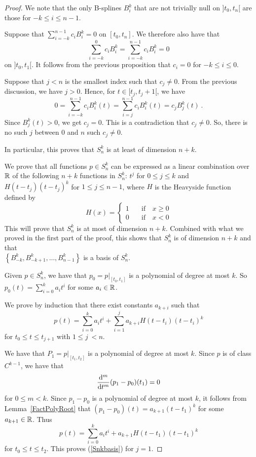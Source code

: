\begin{proof}
We note that the only B-splines $B_i^k$ that are not trivially null on
$]t_0,t_n[$ are those for $-k \leq i \leq n-1$.

Suppose that $\displaystyle \sum_{i=-k}^{n-1} c_i B_i^k = 0$ on $[t_0,t_n]$.
We therefore also have that
\[
  \sum_{i=-k}^0 c_i B_i^k = \sum_{i=-k}^{n-1} c_i B_i^k = 0
\]
on $]t_0,t_1[$.  It follows from the previous proposition that
$c_i = 0$ for $-k \leq i \leq 0$.

Suppose that $j<n$ is the smallest index such that $c_j\neq 0$.  From
the previous discussion, we have $j>0$.  Hence, for
$t \in [t_j,t_j+1[$, we have
\[
 0 = \sum_{i=-k}^{n-1} c_i B_i^k(t) = \sum_{i=j}^{n-1} c_i B_i^k(t) =
  c_j B_j^k(t) \ .
\]
Since $B_j^k(t) > 0$, we get $c_j = 0$.  This is a contradiction that
$c_j \neq 0$.  So, there is no such $j$ between $0$ and $n$ such
$c_j \neq 0$.

In particular, this proves that $S_n^k$ is at least of dimension
$n+k$. 

We prove that all functions $p \in S_n^k$ can be expressed as a linear
combination over $\RR$ of the following $n+k$ functions in $S_n^k$:
$t^j$ for $0\leq j \leq k$ and $H(t-t_j)(t-t_j)^k$ for
$1\leq j \leq n-1$, where $H$ is the Heavyside function defined by
\[
  H(x) = \begin{cases} 1 & \quad \text{if} \quad x \geq 0 \\
    0 & \quad \text{if} \quad x < 0
  \end{cases}
\]
This will prove that $S_n^k$ is at most of dimension $n+k$.  Combined
with what we proved in the first part of the proof, this shows that
$S_n^k$ is of dimension $n+k$ and that\\
$\displaystyle \left\{ B_{-k}^k, B_{-k+1}^k, \ldots , B_{n-1}^k \right\}$
is a basis of $S_n^k$.

Given $p \in S_n^k$, we have that $p_0 = p\big|_{[t_0,t_1]}$ is a polynomial
of degree at most $k$.  So
$\displaystyle p_0(t) = \sum_{i=0}^k a_i t^i$ for some $a_i \in \RR$.

We prove by induction that there exist constants $a_{k+i}$ such that
\begin{equation}\label{Snkbasis}
  p(t) =  \sum_{i=0}^k a_i t^i + \sum_{i=1}^j a_{k+i}H(t-t_i)(t-t_i)^k
\end{equation}
for $t_0 \leq t \leq t_{j+1}$ with $1 \leq j\ < n$.

We have that $P_1 = p\big|_{[t_1,t_2]}$ is a polynomial of degree at
most $k$.  Since $p$ is of class $C^{k-1}$, we have that
\[
  \dfdxn{(p_1 - p_0)(t_1)}{t}{m} = 0
\]
for $0 \leq m < k$.  Since $p_1-p_0$ is a
polynomial of degree at most $k$, it follows from
Lemma~\ref{FactPolyRoot} that
$(p_1-p_0)(t) = a_{k+1} (t- t_1)^k$ for some $a_{k+1} \in \RR$.
Thus
\[
  p(t) =  \sum_{i=0}^k a_i t^i + a_{k+1}H(t-t_1)(t-t_1)^k
\]
for $t_0 \leq t \leq t_2$.  This proves (\ref{Snkbasis}) for $j=1$.


\end{proof}
